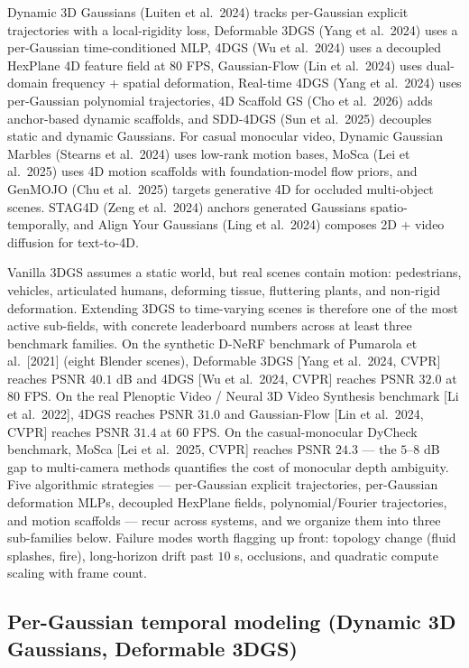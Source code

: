 Dynamic 3D Gaussians (Luiten et al.~2024) tracks per-Gaussian explicit trajectories with a local-rigidity loss, Deformable 3DGS (Yang et al.~2024) uses a per-Gaussian time-conditioned MLP, 4DGS (Wu et al.~2024) uses a decoupled HexPlane 4D feature field at \(80\) FPS, Gaussian-Flow (Lin et al.~2024) uses dual-domain frequency + spatial deformation, Real-time 4DGS (Yang et al.~2024) uses per-Gaussian polynomial trajectories, 4D Scaffold GS (Cho et al.~2026) adds anchor-based dynamic scaffolds, and SDD-4DGS (Sun et al.~2025) decouples static and dynamic Gaussians. For casual monocular video, Dynamic Gaussian Marbles (Stearns et al.~2024) uses low-rank motion bases, MoSca (Lei et al.~2025) uses 4D motion scaffolds with foundation-model flow priors, and GenMOJO (Chu et al.~2025) targets generative 4D for occluded multi-object scenes. STAG4D (Zeng et al.~2024) anchors generated Gaussians spatio-temporally, and Align Your Gaussians (Ling et al.~2024) composes 2D + video diffusion for text-to-4D.

Vanilla 3DGS assumes a static world, but real scenes contain motion: pedestrians, vehicles, articulated humans, deforming tissue, fluttering plants, and non-rigid deformation. Extending 3DGS to time-varying scenes is therefore one of the most active sub-fields, with concrete leaderboard numbers across at least three benchmark families. On the synthetic D-NeRF benchmark of Pumarola et al.~{[}2021{]} (eight Blender scenes), Deformable 3DGS {[}Yang et al.~2024, CVPR{]} reaches PSNR \(40.1\) dB and 4DGS {[}Wu et al.~2024, CVPR{]} reaches PSNR \(32.0\) at \(80\) FPS. On the real Plenoptic Video / Neural 3D Video Synthesis benchmark {[}Li et al.~2022{]}, 4DGS reaches PSNR \(31.0\) and Gaussian-Flow {[}Lin et al.~2024, CVPR{]} reaches PSNR \(31.4\) at \(60\) FPS. On the casual-monocular DyCheck benchmark, MoSca {[}Lei et al.~2025, CVPR{]} reaches PSNR \(24.3\) --- the \(5\)--\(8\) dB gap to multi-camera methods quantifies the cost of monocular depth ambiguity. Five algorithmic strategies --- per-Gaussian explicit trajectories, per-Gaussian deformation MLPs, decoupled HexPlane fields, polynomial/Fourier trajectories, and motion scaffolds --- recur across systems, and we organize them into three sub-families below. Failure modes worth flagging up front: topology change (fluid splashes, fire), long-horizon drift past \(10\) s, occlusions, and quadratic compute scaling with frame count.

\subsection{Per-Gaussian temporal modeling (Dynamic 3D Gaussians, Deformable 3DGS)}\label{per-gaussian-temporal-modeling-dynamic-3d-gaussians-deformable-3dgs}

